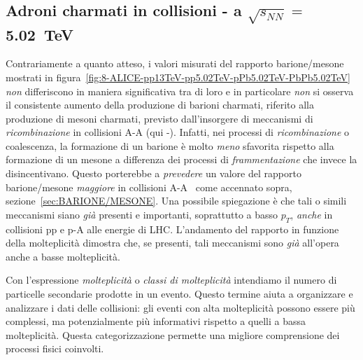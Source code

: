     \subsection{Adroni charmati in collisioni - a $\sqrt{s_{NN}} =$ \qty{5.02}{\tera \eV}}
        Contrariamente a quanto atteso, i valori misurati del rapporto barione/mesone mostrati in figura~\ref{fig:8-ALICE-pp13TeV-pp5.02TeV-pPb5.02TeV-PbPb5.02TeV} \textit{non} differiscono in maniera significativa tra di loro e in particolare \textit{non} si osserva il consistente aumento della produzione di barioni charmati, riferito alla produzione di mesoni charmati, previsto dall'insorgere di meccanismi di \textit{ricombinazione} in collisioni A-A (qui -). Infatti, nei processi di \textit{ricombinazione} o coalescenza, la formazione di un barione è molto \textit{meno} sfavorita rispetto alla formazione di un mesone a differenza dei processi di \textit{frammentazione} che invece la disincentivano. Questo porterebbe a \textit{prevedere} un valore del rapporto barione/mesone \textit{maggiore} in collisioni A-A~\cite{Strazzi_2019} come accennato sopra, sezione~\ref{sec:BARIONE/MESONE}. Una possibile spiegazione è che tali o simili meccanismi siano \textit{già} presenti e importanti, soprattutto a basso $p_T$, \textit{anche} in collisioni pp e p-A alle energie di LHC. L'andamento del rapporto in funzione della molteplicità dimostra che, se presenti, tali meccanismi sono \textit{già} all’opera anche a basse molteplicità.

        Con l'espressione \textit{molteplicità} o \textit{classi di molteplicità} intendiamo il numero di particelle secondarie prodotte in un evento. Questo termine aiuta a organizzare e analizzare i dati delle collisioni: gli eventi con alta molteplicità possono essere più complessi, ma potenzialmente più informativi rispetto a quelli a bassa molteplicità. Questa categorizzazione permette una migliore comprensione dei processi fisici coinvolti.

\newpage
        
